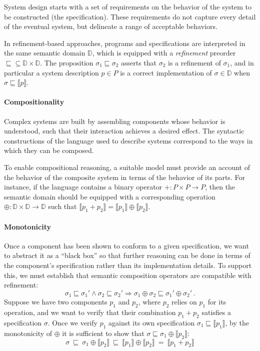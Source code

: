 \documentclass[sigplan,10pt,review,anonymous]{acmart}\settopmatter{printfolios=true,printccs=false,printacmref=false}
\begin{document}
System design starts with a set of requirements
on the behavior of the system to be constructed
(the specification).
These requirements do not capture every detail
of the eventual system,
but delineate a range of acceptable behaviors.

In refinement-based approaches,
programs and specifications are interpreted in the same
semantic domain $\mathbb{D}$,
which is equipped with a \emph{refinement} preorder
${\sqsubseteq} \subseteq \mathbb{D} \times \mathbb{D}$.
The proposition $\sigma_1 \sqsubseteq \sigma_2$
asserts that $\sigma_2$ is a refinement of $\sigma_1$,
and in particular a system description $p \in P$ is a correct implementation
of $\sigma \in \mathbb{D}$ when
$\sigma \sqsubseteq \llbracket p \rrbracket$.


\paragraph{Compositionality} %

Complex systems are built by assembling components
whose behavior is understood,
such that their interaction achieves a desired effect.
The syntactic constructions of
the language used to describe systems
correspond to the ways in which they can be composed.

To enable compositional reasoning,
a suitable model must provide an account of
the behavior of the composite system
in terms of the behavior of its parts.
For instance,
if the language contains a binary operator
${+} : P \times P \rightarrow P$,
then the semantic domain should be equipped with
a corresponding operation
${\oplus} : \mathbb{D} \times \mathbb{D} \rightarrow \mathbb{D}$
such that
$\llbracket p_1 + p_2 \rrbracket =
 \llbracket p_1 \rrbracket \oplus \llbracket p_2 \rrbracket$.


\paragraph{Monotonicity} %

Once a component has been shown to conform to a given specification,
we want to abstract it as a ``black box''
so that further reasoning can be done in terms of
the component's specification rather than its implementation details.
To support this,
we must establish that semantic composition operators
are compatible with refinement:
\[ \sigma_1 \sqsubseteq \sigma_1' \wedge
   \sigma_2 \sqsubseteq \sigma_2' \Rightarrow
   \sigma_1 \oplus \sigma_2 \sqsubseteq \sigma_1' \oplus \sigma_2' \,. \]
Suppose we have two components $p_1$ and $p_2$,
where $p_2$ relies on $p_1$ for its operation,
and we want to verify that their combination $p_1 + p_2$
satisfies a specification $\sigma$.
Once we verify $p_1$ against its own specification
$\sigma_1 \sqsubseteq \llbracket p_1 \rrbracket$,
by the monotonicity of ${\oplus}$ it is sufficient to show that
$\sigma \sqsubseteq \sigma_1 \oplus \llbracket p_2 \rrbracket$:
\[
   \sigma \:\sqsubseteq\:
   \sigma_1 \oplus \llbracket p_2 \rrbracket \:\sqsubseteq\:
   \llbracket p_1 \rrbracket \oplus \llbracket p_2 \rrbracket \:=\:
   \llbracket p_1 + p_2 \rrbracket
\]
\end{document}
